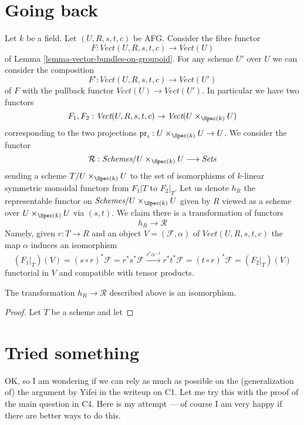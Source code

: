 \section{Going back}
\label{section-going-back}

\noindent
Let $k$ be a field. Let $(U, R, s, t, c)$ be AFG. Consider the fibre functor
$$
F : \textit{Vect}(U, R, s, t, c) \to \textit{Vect}(U)
$$
of Lemma \ref{lemma-vector-bundles-on-groupoid}. For any scheme
$U'$ over $U$ we can consider the composition
$$
F' : \textit{Vect}(U, R, s, t, c) \to \textit{Vect}(U')
$$
of $F$ with the pullback functor $\textit{Vect}(U) \to \textit{Vect}(U')$.
In particular we have two functors
$$
F_1, F_2 :
\textit{Vect}(U, R, s, t, c)
\to
\textit{Vect}(U \times_{\Spec(k)} U)
$$
corresponding to the two projections
$\text{pr}_i : U \times_{\Spec(k)} U \to U$. We consider the functor
$$
\mathcal{R} :
\textit{Schemes}/U \times_{\Spec(k)} U \longrightarrow \textit{Sets}
$$
sending a scheme $T/U \times_{\Spec(k)} U$ to the set of isomorphisms
of $k$-linear symmetric monoidal functors from $F_1|T$ to $F_2|_T$.
Let us denote $h_R$ the representable functor
on $\textit{Schemes}/U \times_{\Spec(k)} U$ given by $R$ viewed as
a scheme over $U \times_{\Spec(k)} U$ via $(s, t)$.
We claim there is a transformation of functors
$$
h_R \longrightarrow \mathcal{R}
$$
Namely, given $r : T \to R$ and an object $V = (\mathcal{F}, \alpha)$ of
$\textit{Vect}(U, R, s, t, c)$ the map $\alpha$ induces an isomorphism
$$
(F_1|_T)(V) = (s \circ r)^*\mathcal{F} = r^*s^*\mathcal{F}
\xrightarrow{r^*\alpha^{-1}}
r^*t^*\mathcal{F} = (t \circ r)^*\mathcal{F} = (F_2|_T)(V)
$$
functorial in $V$ and compatible with tensor products.

\begin{lemma}
\label{lemma-equivalence}
The transformation $h_R \longrightarrow \mathcal{R}$
described above is an isomorphism.
\end{lemma}

\begin{proof}
Let $T$ be a scheme and let
\end{proof}





\section{Tried something}
\label{section-try}

\medskip\noindent
OK, so I am wondering if we can rely as much as possible on the
(generalization of) the argument by Yifei in the writeup on C1.
Let me try this with the proof of the main question in C4.
Here is my attempt --- of course I am very happy if there are
better ways to do this.

